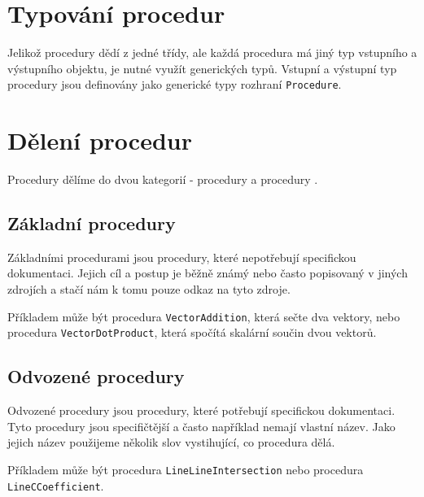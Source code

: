 \section[Typování]{Typování procedur}
\label{sec:procedure-typing}

Jelikož procedury dědí z jedné třídy, ale každá procedura má jiný typ vstupního a výstupního objektu, je nutné využít generických typů\cite{TypeScript:generics}.
Vstupní a výstupní typ procedury jsou definovány jako generické typy rozhraní \texttt{Procedure}\cite[line 6]{geometryjs:source:interfaces:procedure.ts}.

\section[Dělení]{Dělení procedur}
\label{subsec:procedure-categorization}

Procedury dělíme do dvou kategorií - procedury  a procedury \cite{geometryjs:wiki:procedures}.

\subsection[Základní]{Základní procedury}
\label{subsubsec:basic-procedures}

Základními procedurami jsou procedury, které nepotřebují specifickou dokumentaci.
Jejich cíl a postup je běžně známý nebo často popisovaný v jiných zdrojích a stačí nám k tomu pouze odkaz na tyto zdroje.

Příkladem může být procedura \texttt{VectorAddition}\cite[line 9-23]{geometryjs:source:procedures:vectorOperations.ts}, která sečte dva vektory, nebo procedura \texttt{VectorDotProduct}\cite[line 88-99]{geometryjs:source:procedures:vectorOperations.ts}, která spočítá skalární součin dvou vektorů.

\subsection[Odvozené]{Odvozené procedury}
\label{subsubsec:derived-procedures}

Odvozené procedury jsou procedury, které potřebují specifickou dokumentaci\cite{geometryjs:wiki:procedures}.
Tyto procedury jsou specifičtější a často například nemají vlastní název.
Jako jejich název použijeme několik slov vystihující, co procedura dělá.

Příkladem může být procedura \texttt{LineLineIntersection}\cite[line 11-27]{geometryjs:source:procedures:lineLine.ts} nebo procedura \texttt{LineCCoefficient}\cite[line 11-20]{geometryjs:source:procedures:lineEquation.ts}.
